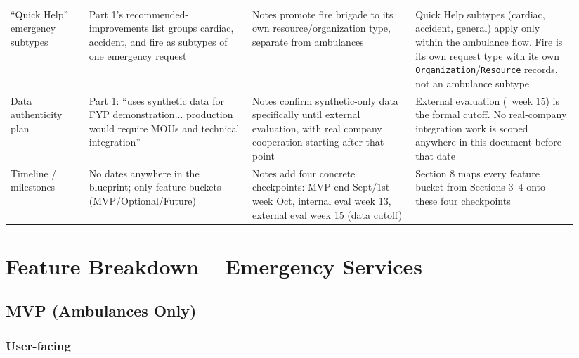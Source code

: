 \documentclass[11pt,a4paper]{article}
\begin{document}
\begin{longtable}{p{0.13\linewidth} p{0.27\linewidth} p{0.27\linewidth} p{0.27\linewidth}}
\addlinespace
``Quick Help'' emergency subtypes & Part 1's recommended-improvements list groups cardiac, accident, and fire as subtypes of one emergency request & Notes promote fire brigade to its own resource/organization type, separate from ambulances & Quick Help subtypes (cardiac, accident, general) apply only within the ambulance flow. Fire is its own request type with its own \texttt{Organization}/\texttt{Resource} records, not an ambulance subtype \\
\addlinespace
Data authenticity plan & Part 1: ``uses synthetic data for FYP demonstration... production would require MOUs and technical integration'' & Notes confirm synthetic-only data specifically until external evaluation, with real company cooperation starting after that point & External evaluation (~week 15) is the formal cutoff. No real-company integration work is scoped anywhere in this document before that date \\
\addlinespace
Timeline / milestones & No dates anywhere in the blueprint; only feature buckets (MVP/Optional/Future) & Notes add four concrete checkpoints: MVP end Sept/1st week Oct, internal eval week 13, external eval week 15 (data cutoff) & Section 8 maps every feature bucket from Sections 3--4 onto these four checkpoints \\
\bottomrule
\end{longtable}
\normalsize

\section{Feature Breakdown -- Emergency Services}

\subsection{MVP (Ambulances Only)}

\subsubsection{User-facing}
\end{document}
